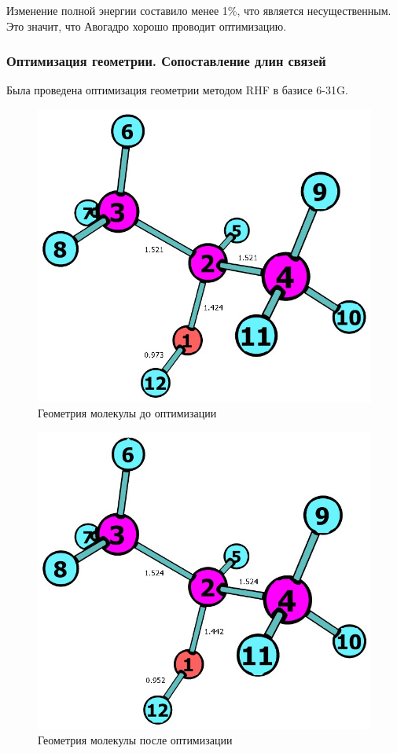 Изменение полной энергии составило менее 1\%, что является несущественным. Это значит, что Авогадро хорошо проводит оптимизацию.

\newpage
\subsubsection*{Оптимизация геометрии. Сопоставление длин связей}
Была проведена оптимизация геометрии методом RHF в базисе 6-31G.

\begin{figure}[H]
\centering
\captionsetup{justification=centering}
\includegraphics[scale=0.4]{fig/2.jpg}
\caption{Геометрия молекулы до оптимизации}
\end{figure}

\begin{figure}[H]
\centering
\captionsetup{justification=centering}
\includegraphics[scale=0.4]{fig/3.jpg}
\caption{Геометрия молекулы после оптимизации}
\end{figure}

